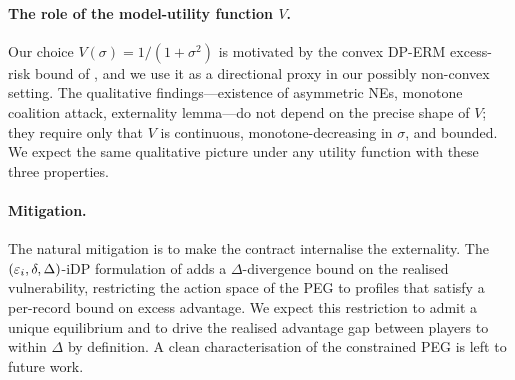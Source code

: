 \paragraph{The role of the model-utility function $V$.} Our choice $V(\sigma)
= 1/(1+\sigma^2)$ is motivated by the convex DP-ERM excess-risk bound of
\citet{bassily2014private}, and we use it as a directional proxy in our
possibly non-convex setting. The qualitative findings---existence of
asymmetric NEs, monotone coalition attack, externality lemma---do not depend
on the precise shape of $V$; they require only that $V$ is continuous,
monotone-decreasing in $\sigma$, and bounded. We expect the same qualitative
picture under any utility function with these three properties.

\paragraph{Mitigation.} The natural mitigation is to make the contract
internalise the externality. The $(\varepsilon_i, \delta, \Delta)$-iDP formulation
of \citet{kaissis2024beyond} adds a $\Delta$-divergence bound on the realised
vulnerability, restricting the action space of the PEG to profiles that
satisfy a per-record bound on excess advantage. We expect this restriction
to admit a unique equilibrium and to drive the realised advantage gap
between players to within $\Delta$ by definition. A clean
characterisation of the constrained PEG is left to future work.

